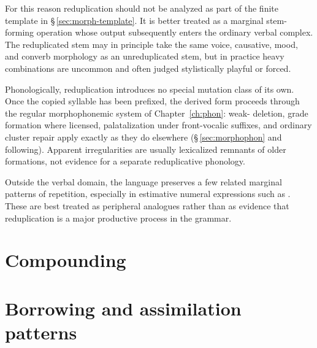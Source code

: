 \pex
\a {} 
\a {} 
\xe

For this reason reduplication should not be analyzed as part of the finite
template in §\,\ref{sec:morph-template}. It is better treated as a marginal
stem-forming operation whose output subsequently enters the ordinary verbal
complex. The reduplicated stem may in principle take the same voice, causative,
mood, and converb morphology as an unreduplicated stem, but in practice heavy
combinations are uncommon and often judged stylistically playful or forced.

Phonologically, reduplication introduces no special mutation class of its own.
Once the copied syllable has been prefixed, the derived form proceeds through
the regular morphophonemic system of Chapter~\ref{ch:phon}: weak-
deletion, grade formation where licensed, palatalization under front-vocalic
suffixes, and ordinary cluster repair apply exactly as they do elsewhere
(§\,\ref{sec:morphophon} and following). Apparent irregularities are usually
lexicalized remnants of older formations, not evidence for a separate
reduplicative phonology.

Outside the verbal domain, the language preserves a few related marginal
patterns of repetition, especially in estimative numeral expressions such as
 . These are best
treated as peripheral analogues rather than as evidence that reduplication is a
major productive process in the grammar.

\section{Compounding}


\section{Borrowing and assimilation patterns}

